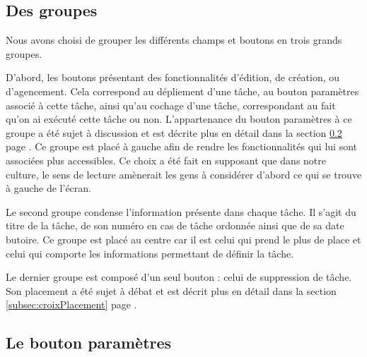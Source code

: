 \documentclass[11pt]{article}
\begin{document}


\subsection{Des groupes}

Nous avons choisi de grouper les différents champs et boutons en trois
grands groupes. 

D'abord, les boutons présentant des fonctionnalités
d'édition, de création, ou d'agencement. Cela correspond au dépliement
d'une tâche, au bouton paramètres associé à cette tâche, ainsi qu'au
cochage d'une tâche, correspondant au fait qu'on ai exécuté cette
tâche ou non. L'appartenance du bouton paramètres à ce groupe a été
sujet à discussion et est décrite plus en détail dans la section
\ref{subsec:paramPlacement} page \pageref{subsec:paramPlacement}. Ce
groupe est placé à gauche afin de rendre les fonctionnalités qui lui
sont associées plus accessibles. Ce choix a été fait en supposant que
dans notre culture, le sens de lecture amènerait les gens à considérer
d'abord ce qui se trouve à gauche de l'écran.

Le second groupe condense l'information présente dans chaque tâche. Il
s'agit du titre de la tâche, de son numéro en cas de tâche ordonnée
ainsi que de sa date butoire. Ce groupe est placé au centre car il est
celui qui prend le plus de place et celui qui comporte les
informations permettant de définir la tâche.

Le dernier groupe est composé d'un seul bouton : celui de suppression
de tâche. Son placement a été sujet à débat et est décrit plus en
détail dans la section \ref{subsec:croixPlacement} page
\pageref{subsec:croixPlacement}.



\subsection{Le bouton paramètres}
\label{subsec:paramPlacement}
\end{document}
